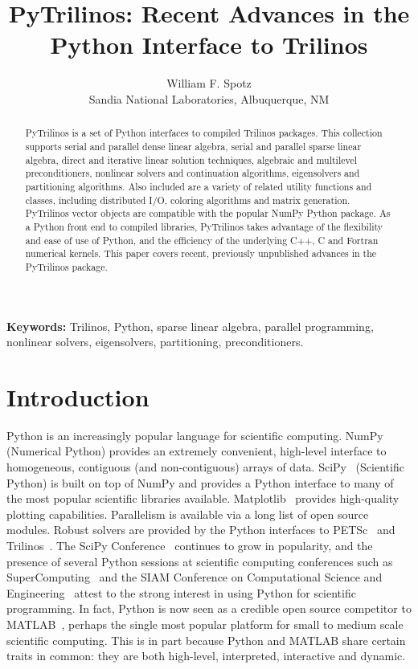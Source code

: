 \documentclass[11pt]{article}
\title{PyTrilinos: Recent Advances in the \\ Python Interface to Trilinos}
\author{William F. Spotz \\ Sandia National Laboratories, Albuquerque, NM}
\newif\ifpdf
\begin{document}
\ifpdf
\DeclareGraphicsExtensions{.png, .pdf, .jpg, .tif}
\else
{}
\fi

\maketitle

\begin{abstract}
PyTrilinos is a set of Python interfaces to compiled Trilinos packages.  This collection supports serial and parallel dense linear algebra, serial and parallel sparse linear algebra, direct and iterative linear solution techniques, algebraic and multilevel preconditioners, nonlinear solvers and continuation algorithms, eigensolvers and partitioning algorithms.  Also included are a variety of related utility functions and classes, including distributed I/O, coloring algorithms and matrix generation.  PyTrilinos vector objects are compatible with the popular NumPy Python package.  As a Python front end to compiled libraries, PyTrilinos takes advantage of the flexibility and ease of use of Python, and the efficiency of the underlying C++, C and Fortran numerical kernels.  This paper covers recent, previously unpublished advances in the PyTrilinos package.
\end{abstract}

{\bf Keywords:} Trilinos, Python, sparse linear algebra, parallel programming, nonlinear solvers, eigensolvers, partitioning, preconditioners.

\section{Introduction}
\label{sec:introduction}

Python is an increasingly popular language for scientific computing.  NumPy~\cite{NumPyGuide} (Numerical Python) provides an extremely convenient, high-level interface to homogeneous, contiguous (and non-contiguous) arrays of data.  SciPy~\cite{SciPyRefGuide} (Scientific Python) is built on top of NumPy and provides a Python interface to many of the most popular scientific libraries available.  Matplotlib~\cite{Matplotlib} provides high-quality plotting capabilities.  Parallelism is available via a long list of open source modules.  Robust solvers are provided by the Python interfaces to PETSc~\cite{PETScUserRef} and Trilinos~\cite{Trilinos}.  The SciPy Conference~\cite{SciPyConference} continues to grow in popularity, and the presence of several Python sessions at scientific computing conferences such as SuperComputing~\cite{SuperComputing} and the SIAM Conference on Computational Science and Engineering~\cite{SIAM_CSE} attest to the strong interest in using Python for scientific programming.  In fact, Python is now seen as a credible open source competitor to MATLAB~\cite{MATLAB}, perhaps the single most popular platform for small to medium scale scientific computing.  This is in part because Python and MATLAB share certain traits in common: they are both high-level, interpreted, interactive and dynamic.
\end{document}
